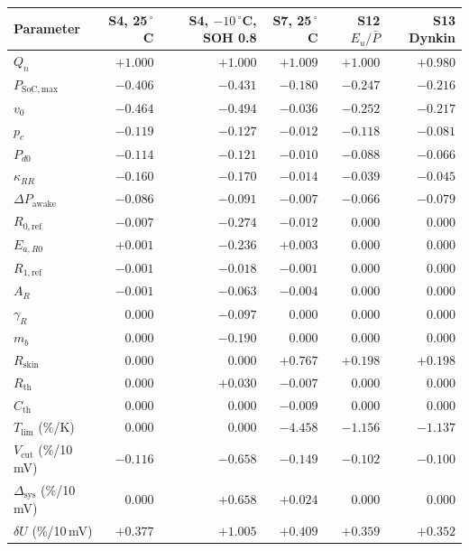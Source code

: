 \begin{tabular}{lrrrrr}
\toprule
Parameter & S4, 25\,$^\circ$C & S4, $-10\,^\circ$C, SOH 0.8 & S7, 25\,$^\circ$C & S12 $E_u/\bar P$ & S13 Dynkin \\
\midrule
$Q_n$ & $+1.000$ & $+1.000$ & $+1.009$ & $+1.000$ & $+0.980$ \\
$P_{\mathrm{SoC,max}}$ & $-0.406$ & $-0.431$ & $-0.180$ & $-0.247$ & $-0.216$ \\
$v_0$ & $-0.464$ & $-0.494$ & $-0.036$ & $-0.252$ & $-0.217$ \\
$p_c$ & $-0.119$ & $-0.127$ & $-0.012$ & $-0.118$ & $-0.081$ \\
$P_{d0}$ & $-0.114$ & $-0.121$ & $-0.010$ & $-0.088$ & $-0.066$ \\
$\kappa_{RR}$ & $-0.160$ & $-0.170$ & $-0.014$ & $-0.039$ & $-0.045$ \\
$\Delta P_{\mathrm{awake}}$ & $-0.086$ & $-0.091$ & $-0.007$ & $-0.066$ & $-0.079$ \\
$R_{0,\mathrm{ref}}$ & $-0.007$ & $-0.274$ & $-0.012$ & $0.000$ & $0.000$ \\
$E_{a,R0}$ & $+0.001$ & $-0.236$ & $+0.003$ & $0.000$ & $0.000$ \\
$R_{1,\mathrm{ref}}$ & $-0.001$ & $-0.018$ & $-0.001$ & $0.000$ & $0.000$ \\
$A_R$ & $-0.001$ & $-0.063$ & $-0.004$ & $0.000$ & $0.000$ \\
$\gamma_R$ & $0.000$ & $-0.097$ & $0.000$ & $0.000$ & $0.000$ \\
$m_b$ & $0.000$ & $-0.190$ & $0.000$ & $0.000$ & $0.000$ \\
$R_{\mathrm{skin}}$ & $0.000$ & $0.000$ & $+0.767$ & $+0.198$ & $+0.198$ \\
$R_{\mathrm{th}}$ & $0.000$ & $+0.030$ & $-0.007$ & $0.000$ & $0.000$ \\
$C_{\mathrm{th}}$ & $0.000$ & $0.000$ & $-0.009$ & $0.000$ & $0.000$ \\
$T_{\mathrm{lim}}$ (\%/K) & $0.000$ & $0.000$ & $-4.458$ & $-1.156$ & $-1.137$ \\
$V_{\mathrm{cut}}$ (\%/10\,mV) & $-0.116$ & $-0.658$ & $-0.149$ & $-0.102$ & $-0.100$ \\
$\Delta_{\mathrm{sys}}$ (\%/10\,mV) & $0.000$ & $+0.658$ & $+0.024$ & $0.000$ & $0.000$ \\
$\delta U$ (\%/10\,mV) & $+0.377$ & $+1.005$ & $+0.409$ & $+0.359$ & $+0.352$ \\
\bottomrule
\end{tabular}
